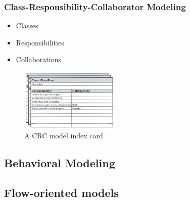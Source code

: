 \subsubsection{Class-Responsibility-Collaborator Modeling}
\begin{itemize}
    \item Classes
    \item Responsibilities
    \item Collaborations
\end{itemize}

\begin{figure}[!htb]
    \centering
    \includegraphics[width=0.42\textwidth]{pic/SE4/A CRC model index card}
    \caption{A CRC model index card}
\end{figure}

\subsection{Behavioral Modeling}

\subsection{Flow-oriented models}